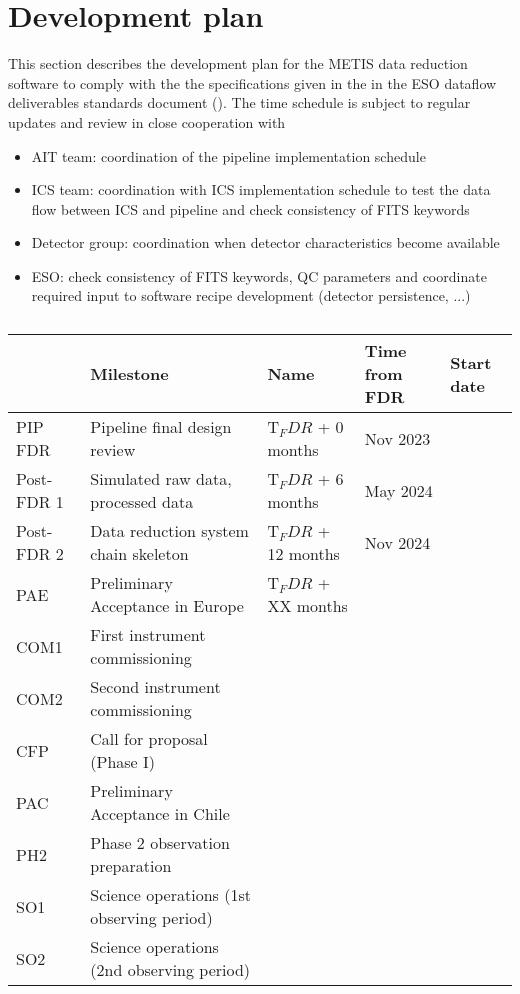 \clearpage
\section{Development plan}\label{sec:development_plan}

This section describes the development plan for the METIS data reduction software to comply with the the specifications given in the in the ESO dataflow deliverables standards document (\cite{1618}). The time schedule is subject to regular updates and review in close cooperation with

\begin{itemize}
    \item AIT team: coordination of the pipeline implementation schedule
    \item ICS team: coordination with ICS implementation schedule to test the data flow between ICS and pipeline and check consistency of FITS keywords
    \item Detector group: coordination when detector characteristics become available
    \item ESO: check consistency of FITS keywords, QC parameters and coordinate required input to software recipe development (detector persistence, ...)
\end{itemize}

\begin{table}
    \caption[Milestones of the METIS pipeline software development schedule starting at FDR]{}
  \label{tab:calibrations_per_mode}
  \centering\scriptsize
  \begin{tabularx}{\textwidth}{llll}
    \hline
                           & Milestone & Name & Time from FDR & Start date \\
    \hline\hline
    PIP FDR          & Pipeline final design review & T$_FDR$ + 0 months & Nov 2023 \\
    Post-FDR 1       & Simulated raw data, processed data &  T$_FDR$ + 6 months & May 2024 \\
    Post-FDR 2       & Data reduction system chain skeleton &  T$_FDR$ + 12 months & Nov 2024 \\
    PAE              & Preliminary Acceptance in Europe &  T$_FDR$ + XX months &  \\
    COM1             & First instrument commissioning &  & \\
    COM2             & Second instrument commissioning &  & \\
    CFP              & Call for proposal (Phase I) &  & \\
    PAC              & Preliminary Acceptance in Chile &  & \\
    PH2              & Phase 2 observation preparation &  & \\
    SO1              & Science operations (1st observing period) &  & \\
    SO2              & Science operations (2nd observing period) &  & \\ 
    

    \hline
  \end{tabularx}
\end{table}